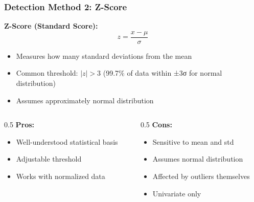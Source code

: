 \documentclass[aspectratio=169]{beamer}
\begin{document}
\begin{frame}
\frametitle{Detection Method 2: Z-Score}

\textbf{Z-Score (Standard Score):}
\begin{equation*}
z = \frac{x - \mu}{\sigma}
\end{equation*}

\begin{itemize}
    \item Measures how many standard deviations from the mean
    \item Common threshold: $|z| > 3$ (99.7\% of data within ±3σ for normal distribution)
    \item Assumes approximately normal distribution
\end{itemize}

\vspace{0.5cm}

\begin{columns}[T]
    \begin{column}{0.5\textwidth}
        \textbf{Pros:}
        \begin{itemize}
            \item Well-understood statistical basis
            \item Adjustable threshold
            \item Works with normalized data
        \end{itemize}
    \end{column}
    \begin{column}{0.5\textwidth}
        \textbf{Cons:}
        \begin{itemize}
            \item Sensitive to mean and std
            \item Assumes normal distribution
            \item Affected by outliers themselves
            \item Univariate only
        \end{itemize}
    \end{column}
\end{columns}

\end{frame}
\end{document}
